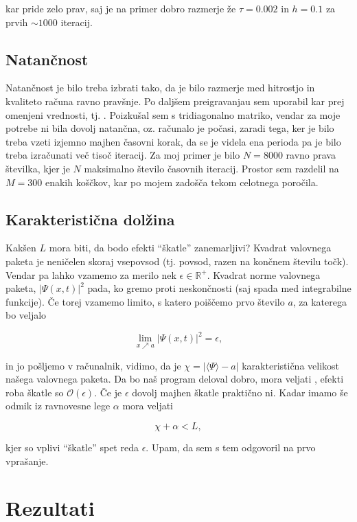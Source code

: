 \documentclass[a4 paper, 12pt]{article}
\begin{document}
kar pride zelo prav, saj je na primer dobro razmerje že $\tau = 0.002$ in $h = 0.1$ za prvih
$\sim 1000$ iteracij.

\subsection{Natančnost}

Natančnost je bilo treba izbrati tako, da je bilo razmerje med hitrostjo in kvaliteto računa
ravno pravšnje. Po daljšem preigravanjau sem uporabil kar prej omenjeni vrednosti, tj.
. Poizkušal sem s tridiagonalno matriko, vendar za moje
potrebe ni bila dovolj natančna, oz. računalo je počasi, zaradi tega, ker je bilo treba vzeti
izjemno majhen časovni korak, da se je videla ena perioda pa je bilo treba izračunati več
tisoč iteracij. Za moj primer je bilo $N = 8000$ ravno prava številka, kjer je $N$ maksimalno
število časovnih iteracij. Prostor sem razdelil na $M = 300$ enakih koščkov, kar po mojem
zadošča tekom celotnega poročila.

\subsection{Karakteristična dolžina}

Kakšen $L$ mora biti, da bodo efekti "`škatle"' zanemarljivi? Kvadrat valovnega paketa je
neničelen skoraj vsepovsod (tj. povsod, razen na končnem številu točk). Vendar pa lahko
vzamemo za merilo nek $\epsilon \in \mathbb{R}^+$. Kvadrat norme valovnega paketa,
$|\Psi(x,t)|^2$ pada, ko gremo proti neskončnosti (saj spada med integrabilne funkcije).
Če torej vzamemo limito, s katero poiščemo prvo število $a$, za katerega bo veljalo

\[
	\lim_{x \nearrow a} |\Psi (x, t)|^2 = \epsilon,
\]

in jo pošljemo v računalnik, vidimo, da je
$\chi = |\langle \Psi \rangle - a|$  karakteristična velikost našega valovnega paketa.
Da bo naš program deloval dobro, mora veljati , efekti roba škatle so
$\mathcal{O}(\epsilon)$. Če je $\epsilon$ dovolj majhen škatle praktično ni. Kadar imamo
še odmik iz ravnovesne lege $\alpha$ mora veljati

\[
	\chi + \alpha < L,
\]

kjer so vplivi "`škatle"' spet reda $\epsilon$. Upam, da sem s tem odgovoril na prvo vprašanje.

\section{Rezultati}
\end{document}
